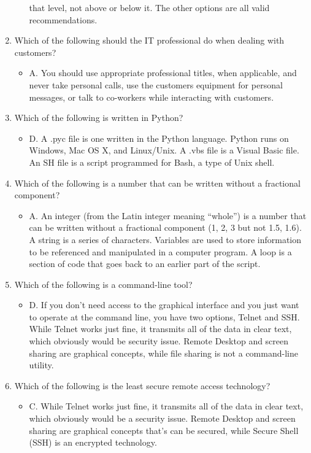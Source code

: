 \documentclass{article}
\begin{document}
\begin{enumerate}
\begin{itemize}
that level, not above or below it.
The other options are all valid recommendations.
    \end{itemize}
    \item Which of the following should the IT professional do when dealing with customers?
    \begin{itemize}
        \item A. You should use appropriate professional titles, when applicable, and never take personal
calls, use the customers equipment for personal messages, or talk to co-workers while
interacting with customers.
    \end{itemize}
    \item Which of the following is written in Python?
    \begin{itemize}
        \item D. A .pyc file is one written in the Python language. Python runs on Windows, Mac OS
X, and Linux/Unix. A .vbs file is a Visual Basic file. An SH file is a script programmed for
Bash, a type of Unix shell.
    \end{itemize}
    \item Which of the following is a number that can be written without a fractional component?
    \begin{itemize}
        \item A. An integer (from the Latin integer meaning “whole”) is a number that can be written
without a fractional component (1, 2, 3 but not 1.5, 1.6). A string is a series of characters.
Variables are used to store information to be referenced and manipulated in a computer
program. A loop is a section of code that goes back to an earlier part of the script.
    \end{itemize}
    \item Which of the following is a command-line tool?
    \begin{itemize}
        \item D. If you don’t need access to the graphical interface and you just want to operate at the
command line, you have two options, Telnet and SSH. While Telnet works just fine, it
transmits all of the data in clear text, which obviously would be security issue. Remote
Desktop and screen sharing are graphical concepts, while file sharing is not a command-line
utility.
    \end{itemize}
    \item Which of the following is the least secure remote access technology?
    \begin{itemize}
        \item C. While Telnet works just fine, it transmits all of the data in clear text, which obviously
would be a security issue. Remote Desktop and screen sharing are graphical concepts that’s
can be secured, while Secure Shell (SSH) is an encrypted technology.
    \end{itemize}
\end{enumerate}
\end{document}
